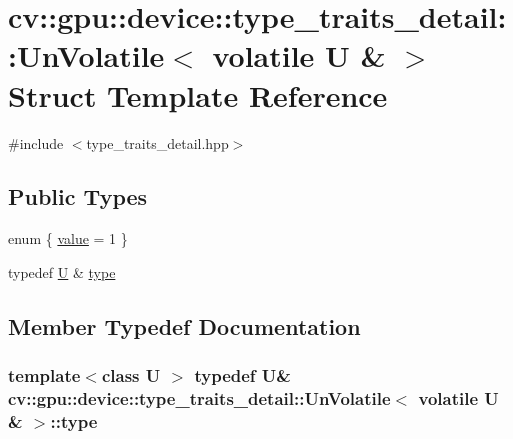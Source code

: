 \hypertarget{structcv_1_1gpu_1_1device_1_1type__traits__detail_1_1UnVolatile_3_01volatile_01U_01_6_01_4}{\section{cv\-:\-:gpu\-:\-:device\-:\-:type\-\_\-traits\-\_\-detail\-:\-:Un\-Volatile$<$ volatile U \& $>$ Struct Template Reference}
\label{structcv_1_1gpu_1_1device_1_1type__traits__detail_1_1UnVolatile_3_01volatile_01U_01_6_01_4}
}


{\ttfamily \#include $<$type\-\_\-traits\-\_\-detail.\-hpp$>$}

\subsection*{Public Types}
\begin{DoxyCompactItemize}
\item 
enum \{ \hyperlink{structcv_1_1gpu_1_1device_1_1type__traits__detail_1_1UnVolatile_3_01volatile_01U_01_6_01_4_a3ac65680b75fa70d25ba6a705131a3c4a45246a89367901f7fa726f16d1f2b2e6}{value} = 1
 \}
\item 
typedef \hyperlink{core__c_8h_aa9c521f41af9a5191e5e4b6ffbae211a}{U} \& \hyperlink{structcv_1_1gpu_1_1device_1_1type__traits__detail_1_1UnVolatile_3_01volatile_01U_01_6_01_4_a7fe6109d51e47e9cac9f9204bcd7f9e9}{type}
\end{DoxyCompactItemize}


\subsection{Member Typedef Documentation}
\hypertarget{structcv_1_1gpu_1_1device_1_1type__traits__detail_1_1UnVolatile_3_01volatile_01U_01_6_01_4_a7fe6109d51e47e9cac9f9204bcd7f9e9}{
\subsubsection[{type}]{\setlength{\rightskip}{0pt plus 5cm}template$<$class U $>$ typedef {\bf U}\& {\bf cv\-::gpu\-::device\-::type\-\_\-traits\-\_\-detail\-::\-Un\-Volatile}$<$ volatile {\bf U} \& $>$\-::{\bf type}}}\label{structcv_1_1gpu_1_1device_1_1type__traits__detail_1_1UnVolatile_3_01volatile_01U_01_6_01_4_a7fe6109d51e47e9cac9f9204bcd7f9e9}


